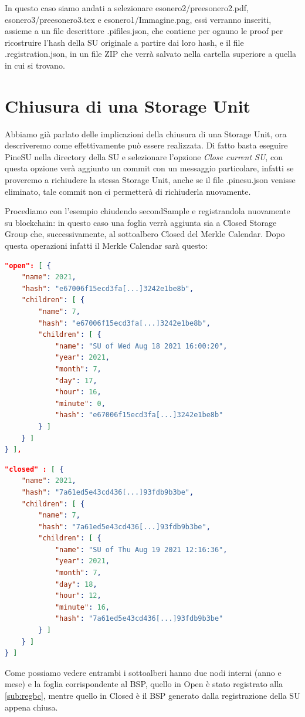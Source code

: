 In questo caso siamo andati a selezionare \textsf{esonero2/preesonero2.pdf},
\textsf{esonero3/preesonero3.tex} e \textsf{esonero1/Immagine.png}, essi verranno inseriti,
assieme a un file descrittore \textsf{.pifiles.json}, che contiene per ognuno le proof
per ricostruire l'hash della SU originale a partire dai loro hash, e il file \textsf{.registration.json},
in un file ZIP che verrà salvato nella cartella superiore a quella in cui si trovano.

\newpage

\section{Chiusura di una Storage Unit}
Abbiamo già parlato delle implicazioni della chiusura di una Storage Unit, ora descriveremo come
effettivamente può essere realizzata. Di fatto basta eseguire PineSU nella directory della SU e
selezionare l'opzione \emph{Close current SU}, con questa opzione verà aggiunto un commit con un
messaggio particolare, infatti se proveremo a richiudere la stessa Storage Unit, anche se
il file \textsf{.pinesu.json} venisse eliminato, tale commit non ci permetterà di richiuderla
nuovamente.

Procediamo con l'esempio chiudendo \textsf{secondSample} e registrandola nuovamente
su blockchain: in questo caso una foglia verrà aggiunta sia a Closed Storage Group che,
successivamente, al sottoalbero Closed del Merkle Calendar.
Dopo questa operazioni infatti il Merkle Calendar sarà questo:


\singlespacing
\begin{lstlisting}[language=json,firstnumber=1]
"open": [ {
    "name": 2021,
    "hash": "e67006f15ecd3fa[...]3242e1be8b",
    "children": [ {
        "name": 7,
        "hash": "e67006f15ecd3fa[...]3242e1be8b",
        "children": [ {
            "name": "SU of Wed Aug 18 2021 16:00:20",
            "year": 2021,
            "month": 7,
            "day": 17,
            "hour": 16,
            "minute": 0,
            "hash": "e67006f15ecd3fa[...]3242e1be8b"
        } ]
    } ]
} ],
\end{lstlisting}
\newpage\begin{lstlisting}[language=json,firstnumber=18]
"closed" : [ {
    "name": 2021,
    "hash": "7a61ed5e43cd436[...]93fdb9b3be",
    "children": [ {
        "name": 7,
        "hash": "7a61ed5e43cd436[...]93fdb9b3be",
        "children": [ {
            "name": "SU of Thu Aug 19 2021 12:16:36",
            "year": 2021,
            "month": 7,
            "day": 18,
            "hour": 12,
            "minute": 16,
            "hash": "7a61ed5e43cd436[...]93fdb9b3be"
        } ]
    } ]
} ]  
\end{lstlisting}
\onehalfspacing
Come possiamo vedere entrambi i sottoalberi hanno due nodi interni (anno e mese) e la foglia
corrispondente al BSP, quello in Open è stato registrato alla \autoref{sub:regbc}, mentre quello
in Closed è il BSP generato dalla registrazione della SU appena chiusa.

